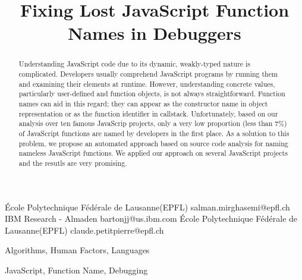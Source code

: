\documentclass[10pt, preprint]{sigplanconf}
\begin{document}
\copyrightdata{[to be supplied]} 


\title{Fixing Lost JavaScript Function Names in Debuggers}


           {\'Ecole Polytechnique F\'ed\'erale de Lausanne(EPFL)}
           {salman.mirghasemi@epfl.ch}
           {IBM Research - Almaden}
           {bartonjj@us.ibm.com}
           {\'Ecole Polytechnique F\'ed\'erale de Lausanne(EPFL)}
           {claude.petitpierre@epfl.ch}

\maketitle

\begin{abstract}
Understanding JavaScript code due to its dynamic, weakly-typed nature is complicated. Developers usually comprehend JavaScript programs by running them and examining their elements at runtime. However, understanding concrete values, particularly user-defined and function objects, is not always straightforward. Function names can aid in this regard; they can appear as the constructor name in object representation or as the function identifier in callstack. Unfortunately, based on our analysis over ten famous JavaScrip projects, only a very low proportion (less than 7\%) of JavaScript functions are named by developers in the first place. As a solution to this problem, we propose an automated approach based on source code analysis for naming nameless JavaScript functions. We applied our approach on several JavaScript projects and the resutls are very promising.
\end{abstract}


\terms
Algorithms, Human Factors, Languages

\keywords
JavaScript, Function Name, Debugging
\end{document}
